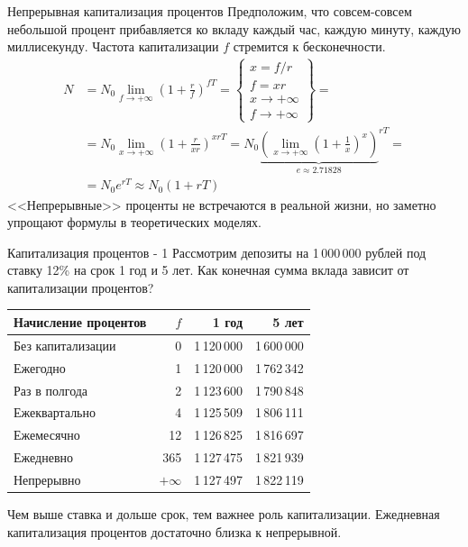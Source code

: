 \documentclass{beamer}
\begin{document}
\begin{frame}{Непрерывная капитализация процентов}
\justify
Предположим, что совсем-совсем небольшой процент прибавляется ко вкладу каждый 
час, каждую минуту, каждую миллисекунду. Частота капитализации $f$ стремится к 
бесконечности.
\begin{align*}
N &= N_0 \lim_{f \to +\infty} \left(1 + \frac{r}{f}\right)^{fT} = 
\begin{Bmatrix}x= f/r \\ f=xr \\ x \to +\infty \\ f \to +\infty\end{Bmatrix} = \\
&= N_0\lim_{x \to +\infty} \left(1 + \frac{r}{xr}\right) ^ {xrT} =
N_0{\underbrace{\left(\lim_{x \to +\infty} \left( 1 + \frac{1}{x} \right) ^ x\right)}_{e \approx 2.71828}}  ^ {rT} = \\
&= N_0e^{rT} \approx N_0(1 + rT)
\end{align*}
<<Непрерывные>> проценты не встречаются в реальной жизни, но заметно упрощают 
формулы в теоретических моделях.
\end{frame}



\begin{frame}{Капитализация процентов - 1}
\justify
Рассмотрим депозиты на 1\,000\,000 рублей под ставку 12\% на срок 1 год и 5 лет. 
Как конечная сумма вклада зависит от капитализации процентов?


\begin{table}
\centering
\begin{tabular}{l|r|r|r}
Начисление процентов & $f$ & 1 год & 5 лет \\ \hline
Без капитализации & 0         & 1\,120\,000 & 1\,600\,000 \\
Ежегодно          & 1         & 1\,120\,000 & 1\,762\,342 \\
Раз в полгода     & 2         & 1\,123\,600 & 1\,790\,848 \\
Ежеквартально     & 4         & 1\,125\,509 & 1\,806\,111 \\
Ежемесячно        & 12        & 1\,126\,825 & 1\,816\,697 \\
Ежедневно         & 365       & 1\,127\,475 & 1\,821\,939 \\
Непрерывно        & $+\infty$ & 1\,127\,497 & 1\,822\,119
\end{tabular}
\end{table}

\justifying
Чем выше ставка и дольше срок, тем важнее роль капитализации. Ежедневная капитализация процентов достаточно близка к непрерывной.
\end{frame}
\end{document}
